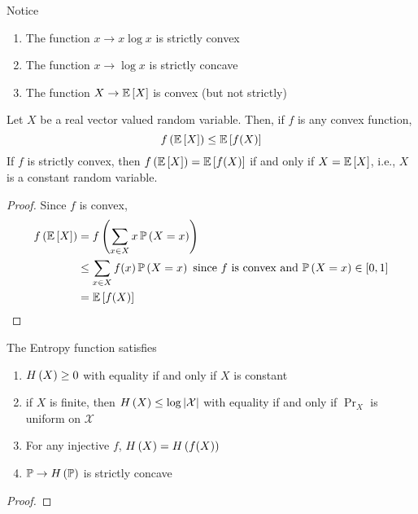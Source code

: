 \begin{example}
    Notice
    \begin{enumerate}[label=(\arabic*)]
        \item The function $x \to x\log{x}$ is strictly convex
        \item The function $x \to \log{x}$ is strictly concave
        \item The function $X \to \expectation{X}$ is convex (but not strictly)
    \end{enumerate}
\end{example}

\begin{theorem}
    Let $X$ be a real vector valued random variable. Then, if $f$ is any convex
    function,
    \[f\left(\expectation{X}\right) \leq \expectation{f(X)}\]
    If $f$ is strictly convex, then $f\left(\expectation{X}\right) = \expectation{f(X)}$
    if and only if $X = \expectation{X}$, i.e., $X$ is a constant random variable.
\end{theorem}

\begin{proof}
    Since $f$ is convex,
    \begin{align*}f\left(\expectation{X}\right)
         & = f\left(\sum_{x \in X}x\prob{X = x}\right)                                                  \\
         & \leq \sum_{x \in X}f(x)\prob{X = x}\hbox{ since $f$ is convex and $\prob{X = x} \in [0, 1]$} \\
         & = \expectation{f(X)}\qedhere
    \end{align*}
\end{proof}

\begin{theorem}
    The Entropy function satisfies
    \begin{enumerate}[label=(\arabic*)]
        \item $H\left(X\right) \geq 0$ with equality if and only if $X$ is constant
        \item if $X$ is finite, then $H\left(X\right) \leq \log\left\lvert\mathcal{X}\right\rvert$ with
              equality if and only if $\Pr_X$ is uniform on $\mathcal{X}$
        \item For any injective $f$, $H\left(X\right) = H\left(f(X)\right)$
        \item $\mathbb{P} \to H\left(\mathbb{P}\right)$ is strictly concave
    \end{enumerate}
\end{theorem}

\begin{proof}\mbox{}

\end{proof}